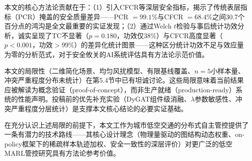 \documentclass[12pt,a4paper,UTF8]{ctexart}
\begin{document}
本文的核心方法论贡献在于：（1）引入CFCR等深层安全指标，揭示了传统表层指标（PCR）掩盖的安全质量差异——PCR $=99.1\%$与CFCR $=68.4\%$之间30.7个百分点的鸿沟是全文最重要的实证发现；（2）通过Welch $t$检验与事后统计功效分析，诚实呈现了TC不显著（$p=0.180$，功效仅38\%）与CFCR高度显著（$p<0.001$，功效$>99\%$）的差异化统计图景——这种区分统计功效不足与效应量为零的分析范式，对于安全攸关的AI系统评估具有方法论示范价值。

本文的局限性（二维简化场景、均匀风扰模型、有限基线覆盖、$n=5$小样本量、冲突严重程度分布未统计）在第5.4节中已有坦诚讨论。这些局限意味着当前结果应被解读为概念验证（proof-of-concept），而非生产就绪（production-ready）系统的性能声明。投稿前的优先补充实验（DyGAT组件级消融、$\lambda$参数敏感性、冲突严重程度分层统计）是支撑本文核心结论的必要实证基础。

在充分认识上述局限的前提下，本文工作为城市低空交通的分布式自主管控提供了一条有潜力的技术路线——其核心设计理念（物理量驱动的图结构动态权重、on-policy框架下的稀疏样本轨迹加权、安全一致性的深层评价）对更广泛的低空MARL管控研究具有方法论参考价值。
\end{document}
